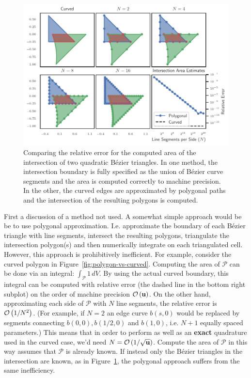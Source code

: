 \begin{figure}
  \includegraphics{../images/curved-mesh/polygon_vs_curved_intersection.pdf}
  \centering
  \captionsetup{width=.75\linewidth}
  \caption{Comparing the relative error for the computed area of the
    intersection of two quadratic B\'{e}zier triangles. In one method, the
    intersection boundary is fully specified as the union of B\'{e}zier curve
    segments and the area is computed correctly to machine precision. In the
    other, the curved edges are approximated by polygonal paths and the
    intersection of the resulting polygons is computed.}
  \label{fig:polygon-vs-curved-intersection}
\end{figure}

First a discussion of a method not used. A somewhat simple approach would be
be to use polygonal approximation. I.e. approximate the boundary of each
B\'{e}zier triangle with line segments, intersect the resulting polygons,
triangulate the intersection polygon(s) and then numerically integrate
on each triangulated cell. However, this approach is prohibitively inefficient.
For example, consider the curved polygon in
Figure~\ref{fig:polygon-vs-curved}. Computing the area of \(\mathcal{P}\)
can be done via an integral: \(\int_{\mathcal{P}} 1 \, dV\).
By using the actual curved boundary, this integral can be computed with
relative error (the dashed line in the bottom right subplot) on the order
of machine precision \(\mathcal{O}\left(\mathbf{u}\right)\). On the other hand, approximating
each side of \(\mathcal{P}\) with \(N\) line segments, the relative error is
\(\mathcal{O}\left(1/N^2\right)\). (For example, if \(N = 2\) an edge curve \(b(s, 0)\) would be
replaced by segments connecting \(b(0, 0), b(1/2, 0)\) and \(b(1, 0)\), i.e.
\(N + 1\) equally spaced parameters.) This means that in order to perform as
well as an \textbf{exact} quadrature used in the curved case, we'd
need \(N = \mathcal{O}\left(1/\sqrt{\mathbf{u}}\right)\). Compute the area of \(\mathcal{P}\)
in this way assumes that \(\mathcal{P}\) is already known.
If instead only the B\'{e}zier triangles in the intersection are known, as
in Figure~\ref{fig:polygon-vs-curved-intersection}, the polygonal approach
suffers from the same inefficiency.

